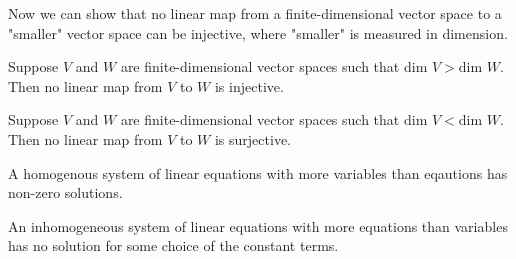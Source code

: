 \documentclass[11pt]{article} %
\renewcommand\dim{\text{dim }}
\begin{document}
Now we can show that no linear map from a finite-dimensional vector space to a "smaller" vector space can be injective, where "smaller" is measured in dimension.

{Suppose $V$ and $W$ are finite-dimensional vector spaces such that $\dim V > \dim W$. Then no linear map from $V$ to $W$ is injective.}
{}

{Suppose $V$ and $W$ are finite-dimensional vector spaces such that $\dim V < \dim W$. Then no linear map from $V$ to $W$ is surjective.}
{}

{A homogenous system of linear equations with more variables than eqautions has non-zero solutions.}
{}

{An inhomogeneous system of linear equations with more equations than variables has no solution for some choice of the constant terms.}
{}

\end{document}

